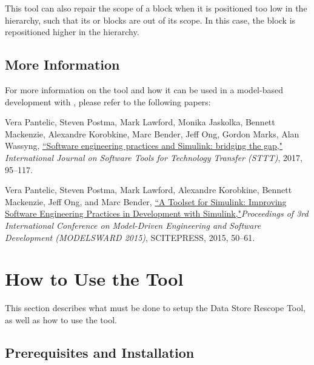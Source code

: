 \documentclass{article}
\makeatletter
\newcommand{\ToolName}{Data Store Rescope Tool\@\xspace}
\makeatother
\begin{document}
This tool can also repair the scope of a \DSM block when it is positioned too low in the hierarchy, such that its \DSR or \DSW blocks are out of its scope. In this case, the \DSM block is repositioned higher in the hierarchy.

\subsection{More Information}
For more information on the tool and how it can be used in a model-based development with \Simulink, please refer to the following papers:

\vspace{1em}
Vera Pantelic, Steven Postma, Mark Lawford, Monika Jaskolka, Bennett Mackenzie, Alexandre Korobkine, Marc Bender, Jeff Ong, Gordon Marks, Alan Wassyng, \href{https://link.springer.com/article/10.1007/s10009-017-0450-9}{``Software engineering practices and Simulink: bridging the gap,"} \textit{International Journal on Software Tools for Technology Transfer (STTT)}, 2017, 95--117.

\vspace{1em}
Vera Pantelic, Steven Postma, Mark Lawford, Alexandre Korobkine, Bennett Mackenzie, Jeff Ong, and Marc Bender, \href{http://www.cas.mcmaster.ca/~lawford/papers/MODELSWARD2015.pdf}{``A Toolset for Simulink: Improving Software Engineering Practices in Development with Simulink,"}\textit{Proceedings of 3rd International Conference on Model-Driven Engineering and Software Development (MODELSWARD 2015)}, SCITEPRESS, 2015, 50--61.

\newpage
\section{How to Use the Tool}
This section describes what must be done to setup the \ToolName, as well as how to use the tool.

\subsection{Prerequisites and Installation}
\end{document}
